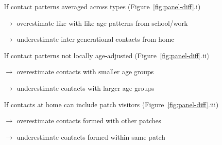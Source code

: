 \begin{assumptions}
  \item If contact patterns averaged across types (Figure~\ref{fig:panel-diff}.i)
        \par$\rightarrow$ overestimate like-with-like age patterns from school/work
        \par$\rightarrow$ underestimate inter-generational contacts from home
  \item If contact patterns not locally age-adjusted (Figure~\ref{fig:panel-diff}.ii)
        \par$\rightarrow$ overestimate contacts with smaller age groups
        \par$\rightarrow$ underestimate contacts with larger age groups
  \item If contacts at home can include patch visitors (Figure~\ref{fig:panel-diff}.iii)
        \par$\rightarrow$ overestimate contacts formed with other patches
        \par$\rightarrow$ underestimate contacts formed within same patch
\end{assumptions}
